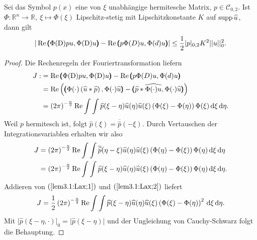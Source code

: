 \begin{lem}
	Sei das Symbol $p(x)$ eine von $\xi$ unabhängige hermitesche Matrix, $p\in \mathcal{C}_{0,2}$. Ist $\Phi: \mathbb{R}^n\rightarrow\mathbb{R}, \ \xi \mapsto\Phi(\xi)$ Lipschitz-stetig mit Lipschitzkonstante $K$ auf $\operatorname{supp} \widehat{u}$, dann gilt
	\begin{align}
		\vert \operatorname{Re} \pmb(\Phi(\mathrm D)pu,\Phi(\mathrm D)u\pmb)-\operatorname{Re}\pmb(p\Phi(D)u,\Phi(d)u\pmb)\vert \le\frac{1}{2}\vert p\vert_{0,2}K^2\vert\vert u\vert\vert_0^2.
\end{align}	 
\end{lem}
\begin{proof}
	Die Rechenregeln der Fouriertransformation liefern
	\begin{align}\label{lem3.1:Lax;1}
		\begin{split} J:&=  \operatorname{Re} \pmb(\Phi(\mathrm D)pu,\Phi(\mathrm D)u\pmb)-\operatorname{Re}\pmb(p\Phi(D)u,\Phi(d)u\pmb) \\
		&=\operatorname{Re} \left( \pmb(\Phi(\cdot)\left(\widehat{u}\ast \widehat{p}\right),\Phi(\cdot)\widehat{u}\pmb)-\pmb(\widehat{p}\ast\widehat{\Phi(\cdot)u},\Phi(\cdot)\widehat{u}\pmb)\right)\\
		&= \left(2\pi\right)^{-\frac{n}{2}}\operatorname{Re}\int\int\widehat{p}(\xi-\eta)\widehat{u}(\eta)\widehat{u}(\xi)\left(\Phi(\xi)-\Phi(\eta)\right)\Phi(\xi)\,\mathrm d \xi\,\mathrm d\eta.
		\end{split}
	\end{align}
	Weil $p$ hermitesch ist, folgt $\widehat{p}(\xi) = \overline{\widehat{p}}(-\xi)$. Durch Vertauschen der Integrationsvariablen erhalten wir also
	\begin{align}\label{lem3.1:Lax;2}
	\begin{split}	J&= \left(2\pi\right)^{-\frac{n}{2}}\operatorname{Re}\int\int\overline{\widehat{p}}(\eta-\xi)\widehat{u}(\eta)\widehat{u}(\xi)\left(\Phi(\eta)-\Phi(\xi)\right)\Phi(\eta)\,\mathrm d \xi\,\mathrm d\eta\\
		&= \left(2\pi\right)^{-\frac{n}{2}}\operatorname{Re}\int\int\widehat{p}(\xi-\eta)\widehat{u}(\eta)\widehat{u}(\xi)\left(\Phi(\eta)-\Phi(\xi)\right)\Phi(\eta)\,\mathrm d \xi\,\mathrm d\eta.
	\end{split}	
	\end{align}
	Addieren von $(\ref{lem3.1:Lax;1})$ und $(\ref{lem3.1:Lax;2})$ liefert
	\begin{align}
		J= \frac{1}{2}\left(2\pi\right)^{-\frac{n}{2}}\operatorname{Re}\int\int \widehat{p}(\xi-\eta)\widehat{u}(\eta)\widehat{u}(\xi)\left(\Phi(\xi)-\Phi(\eta)\right)^2\,\mathrm d\xi\,\mathrm d\eta.
	\end{align}
	Mit $\vert \widehat{p}(\xi-\eta,\cdot)\vert_0 = \vert \widehat{p}(\xi-\eta)\vert$ und der Ungleichung von Cauchy-Schwarz folgt die Behauptung. 
\end{proof}


